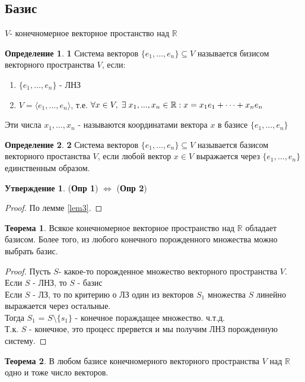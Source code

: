 \documentclass[a4paper, 12pt]{article}
\newcommand{\R}{\mathbb R}
\newcommand\tab[1][.5cm]{\hspace*{#1}}
\theoremstyle{definition}
\newtheorem*{definition}{Определение}
\newtheorem*{theorem}{Теорема}
\newtheorem*{subtheorem}{Утверждение}
\begin{document}
\subsection{Базис}
$V$- конечномерное векторное простанство над $\R$ 
\begin{definition}\tab[-0.1cm]\textbf{1} 
  Система векторов $\{e_1,...,e_n\}\subseteq V$ называется бизисом векторного пространства $V$, если:
  \begin{enumerate}
    \item $\{e_1,...,e_n\}$ - ЛНЗ
    \item $V = \langle e_1,...,e_n \rangle$, т.е. $\forall x \in V, \tab[0.1cm] \exists \tab[0.1cm] x_1,...,x_n \in \R: x = x_1e_1+\cdots + x_ne_n$  
  \end{enumerate}
  Эти числа $x_1,...,x_n$ - называются координатами вектора $x$ в базисе $\{e_1,...,e_n\}$ 
\end{definition} 
\begin{definition}\tab[-0.1cm]\textbf{2} 
  Система векторов $\{e_1,...,e_n\} \subseteq V$ называется базисом векторного простанства $V$, если любой вектор $x \in V$ выражается через $\{e_1,...,e_n\}$ единственным образом.
\end{definition} 
  \begin{subtheorem}
    (\textbf{Опр 1}) $\Longleftrightarrow $ (\textbf{Опр 2})
  \end{subtheorem} 
  \begin{proof}
    По лемме \eqref{lem3}.
  \end{proof}
  \begin{theorem}
    Всякое конечномерное векторное пространство над $\R$ обладает базисом. Более того, из любого конечного порожденного множества можно выбрать базис.
  \end{theorem} 
  \begin{proof}
    Пусть $S$- какое-то порожденное множество векторного пространства $V$. \\
    Если $S$ - ЛНЗ, то $S$ - базис \\
    Если $S$ - ЛЗ, то по критерию о ЛЗ один из векторов $S_1$ множества $S$ линейно выражается через остальные. \\
    Тогда $S_1$ = $S\setminus\{s_1\}$ - конечное пораждащее множество. ч.т.д. \\
    Т.к. $S$ - конечное, это процесс прервется и мы получим ЛНЗ порожденную систему.
  \end{proof} 
  \begin{theorem}
    В любом базисе конечномерного векторного пространства $V$ над $\R$ одно и тоже число векторов.
  \end{theorem} 
\end{document}
